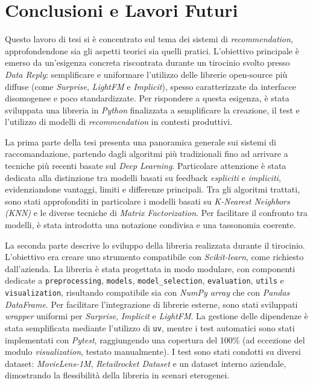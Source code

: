 \chapter{Conclusioni e Lavori Futuri}
Questo lavoro di tesi si è concentrato sul tema dei sistemi di \textit{recommendation}, approfondendone sia gli aspetti teorici sia quelli pratici. L'obiettivo principale è emerso da un'esigenza concreta riscontrata durante un tirocinio svolto presso \textit{Data Reply}: semplificare e uniformare l'utilizzo delle librerie open-source più diffuse (come \textit{Surprise}, \textit{LightFM} e \textit{Implicit}), spesso caratterizzate da interfacce disomogenee e poco standardizzate. Per rispondere a questa esigenza, è stata sviluppata una libreria in \textit{Python} finalizzata a semplificare la creazione, il test e l'utilizzo di modelli di \textit{recommendation} in contesti produttivi.

La prima parte della tesi presenta una panoramica generale sui sistemi di raccomandazione, partendo dagli algoritmi più tradizionali fino ad arrivare a tecniche più recenti basate sul \textit{Deep Learning}. Particolare attenzione è stata dedicata alla distinzione tra modelli basati su feedback \textit{espliciti} e \textit{impliciti}, evidenziandone vantaggi, limiti e differenze principali. Tra gli algoritmi trattati, sono stati approfonditi in particolare i modelli basati su \textit{K-Nearest Neighbors (KNN)} e le diverse tecniche di \textit{Matrix Factorization}. Per facilitare il confronto tra modelli, è stata introdotta una notazione condivisa e una tassonomia coerente.

La seconda parte descrive lo sviluppo della libreria realizzata durante il tirocinio. L'obiettivo era creare uno strumento compatibile con \textit{Scikit-learn}, come richiesto dall'azienda. La libreria è stata progettata in modo modulare, con componenti dedicate a \texttt{preprocessing}, \texttt{models}, \texttt{model\_selection}, \texttt{evaluation}, \texttt{utils} e \texttt{visualization}, risultando compatibile sia con \textit{NumPy array} che con \textit{Pandas DataFrame}. Per facilitare l'integrazione di librerie esterne, sono stati sviluppati \textit{wrapper} uniformi per \textit{Surprise}, \textit{Implicit} e \textit{LightFM}. La gestione delle dipendenze è stata semplificata mediante l'utilizzo di \texttt{uv}, mentre i test automatici sono stati implementati con \textit{Pytest}, raggiungendo una copertura del 100\% (ad eccezione del modulo \textit{visualization}, testato manualmente). I test sono stati condotti su diversi dataset: \textit{MovieLens-1M}, \textit{Retailrocket Dataset} e un dataset interno aziendale, dimostrando la flessibilità della libreria in scenari eterogenei.

